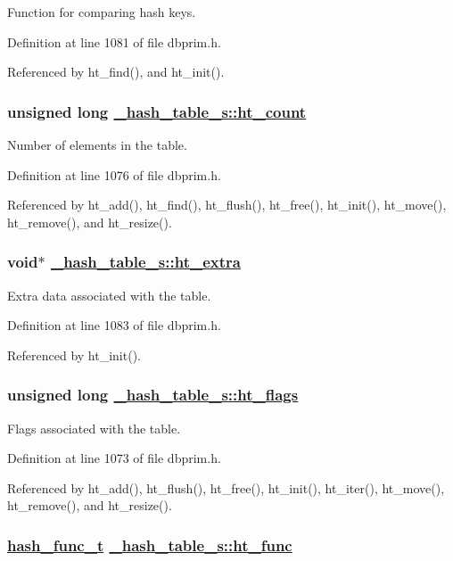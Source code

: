 Function for comparing hash keys. 

Definition at line 1081 of file dbprim.h.

Referenced by ht\_\-find(), and ht\_\-init().\hypertarget{struct__hash__table__s_o3}{
\subsubsection[ht\_\-count]{\setlength{\rightskip}{0pt plus 5cm}unsigned long \hyperlink{struct__hash__table__s_o3}{\_\-hash\_\-table\_\-s::ht\_\-count}}}
\label{struct__hash__table__s_o3}


Number of elements in the table. 

Definition at line 1076 of file dbprim.h.

Referenced by ht\_\-add(), ht\_\-find(), ht\_\-flush(), ht\_\-free(), ht\_\-init(), ht\_\-move(), ht\_\-remove(), and ht\_\-resize().\hypertarget{struct__hash__table__s_o10}{
\subsubsection[ht\_\-extra]{\setlength{\rightskip}{0pt plus 5cm}void$\ast$ \hyperlink{struct__hash__table__s_o10}{\_\-hash\_\-table\_\-s::ht\_\-extra}}}
\label{struct__hash__table__s_o10}


Extra data associated with the table. 

Definition at line 1083 of file dbprim.h.

Referenced by ht\_\-init().\hypertarget{struct__hash__table__s_o1}{
\subsubsection[ht\_\-flags]{\setlength{\rightskip}{0pt plus 5cm}unsigned long \hyperlink{struct__hash__table__s_o1}{\_\-hash\_\-table\_\-s::ht\_\-flags}}}
\label{struct__hash__table__s_o1}


Flags associated with the table. 

Definition at line 1073 of file dbprim.h.

Referenced by ht\_\-add(), ht\_\-flush(), ht\_\-free(), ht\_\-init(), ht\_\-iter(), ht\_\-move(), ht\_\-remove(), and ht\_\-resize().\hypertarget{struct__hash__table__s_o7}{
\subsubsection[ht\_\-func]{\setlength{\rightskip}{0pt plus 5cm}\hyperlink{group__dbprim__hash_ga4}{hash\_\-func\_\-t} \hyperlink{struct__hash__table__s_o7}{\_\-hash\_\-table\_\-s::ht\_\-func}}}
\label{struct__hash__table__s_o7}


